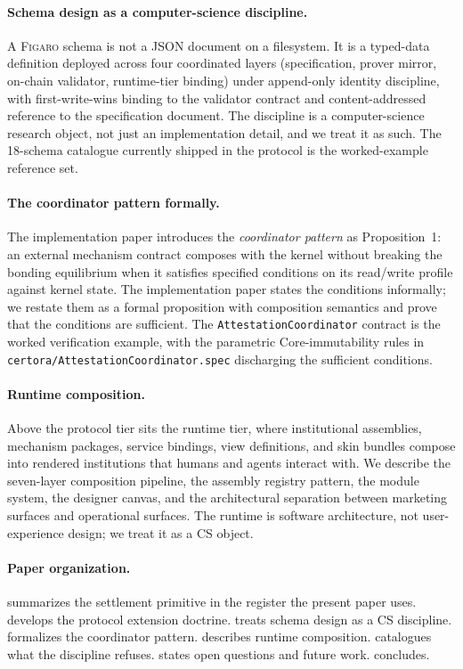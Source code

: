 \documentclass[11pt,a4paper]{article}
\theoremstyle{definition}
\theoremstyle{remark}
\newcommand{\figaro}{\textsc{Figaro}}
\begin{document}
\paragraph{Schema design as a computer-science discipline.}
A \figaro{} schema is not a JSON document on a filesystem. It is a
typed-data definition deployed across four coordinated layers
(specification, prover mirror, on-chain validator, runtime-tier
binding) under append-only identity discipline, with first-write-wins
binding to the validator contract and content-addressed reference
to the specification document. The discipline is a computer-science
research object, not just an implementation detail, and we treat it
as such. The 18-schema catalogue currently shipped in the protocol
is the worked-example reference set.

\paragraph{The coordinator pattern formally.}
The implementation paper introduces the \emph{coordinator pattern}
as Proposition~1: an external mechanism contract composes with the
kernel without breaking the bonding equilibrium when it satisfies
specified conditions on its read/write profile against kernel state.
The implementation paper states the conditions informally; we
restate them as a formal proposition with composition semantics
and prove that the conditions are sufficient. The
\texttt{AttestationCoordinator} contract is the worked verification
example, with the parametric Core-immutability rules in
\texttt{certora/AttestationCoordinator.spec} discharging the
sufficient conditions.

\paragraph{Runtime composition.}
Above the protocol tier sits the runtime tier, where institutional
assemblies, mechanism packages, service bindings, view
definitions, and skin bundles compose into rendered institutions
that humans and agents interact with. We describe the seven-layer
composition pipeline, the assembly registry pattern, the module
system, the designer canvas, and the architectural separation
between marketing surfaces and operational surfaces. The runtime
is software architecture, not user-experience design; we treat it
as a CS object.

\paragraph{Paper organization.}
 summarizes the settlement primitive in the
register the present paper uses.
 develops the protocol extension doctrine.
 treats schema design as a CS discipline.
 formalizes the coordinator pattern.
 describes runtime composition.
 catalogues what the discipline refuses.
 states open questions and future work.
 concludes.
\end{document}
